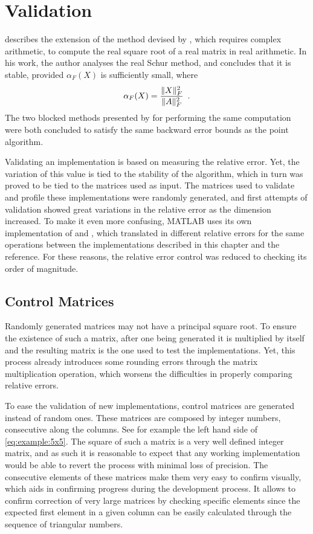 \documentclass[../thesis]{subfiles}
\begin{document}
	\section{Validation}

	 describes the extension of the method devised by \citeauthor{bjorck:hammarling:1983}, which requires complex arithmetic, to compute the real square root of a real matrix in real arithmetic. In his work, the author analyses the real Schur method, and concludes that it is stable, provided $\alpha_F(X)$ is sufficiently small, where $$\alpha_F(X) = \frac{\lVert X\rVert_F^2}{\lVert A\rVert_F^2}\enspace.$$ The two blocked methods presented by  for performing the same computation were both concluded to satisfy the same backward error bounds as the point algorithm.

	Validating an implementation is based on measuring the relative error. Yet, the variation of this value is tied to the stability of the algorithm, which in turn was proved to be tied to the matrices used as input. The matrices used to validate and profile these implementations were randomly generated, and first attempts of validation showed great variations in the relative error as the dimension increased. To make it even more confusing, MATLAB uses its own implementation of \blas and \lapack, which translated in different relative errors for the same operations between the implementations described in this chapter and the reference. For these reasons, the relative error control was reduced to checking its order of magnitude.

		\subsection{Control Matrices}
		Randomly generated matrices may not have a principal square root. To ensure the existence of such a matrix, after one being generated it is multiplied by itself and the resulting matrix is the one used to test the implementations. Yet, this process already introduces some rounding errors through the matrix multiplication operation, which worsens the difficulties in properly comparing relative errors.

		To ease the validation of new implementations, control matrices are generated instead of random ones. These matrices are composed by integer numbers, consecutive along the columns. See for example the left hand side of \cref{eq:example:5x5}. The square of such a matrix is a very well defined integer matrix, and as such it is reasonable to expect that any working implementation would be able to revert the process with minimal loss of precision. The consecutive elements of these matrices make them very easy to confirm visually, which aids in confirming progress during the development process. It allows to confirm correction of very large matrices by checking specific elements since the expected first element in a given column can be easily calculated through the sequence of triangular numbers.
\end{document}
